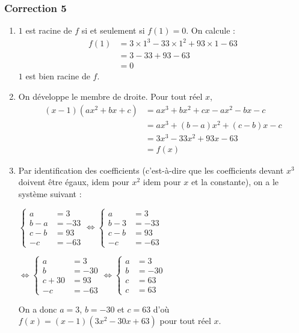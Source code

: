 \documentclass[15pt, mathserif]{beamer}
\begin{document}
\begin{frame}
\vspace{-10mm}
	\frametitle{Correction 5}
\bigskip 
 \begin{enumerate} 
 	 \item $1$ est racine de $f$ si et seulement si $f(1)=0$. On calcule : 
 	 	 \begin{align*}f(1)&= 3 \times 1^3 -33 \times 1^2+93\times 1-63 \\ 
 &= 3-33+93-63 \\ 
 &= 0 
 	  \end{align*} 
  $1$ est bien racine de $f$. 
 	 \item On développe le membre de droite. Pour tout réel $x$, 
 	 \begin{align*} (x-1)(ax^2+bx+c) 
 &= ax^3+bx^2+cx-ax^2-bx-c \\ 
   &= ax^3 +(b-a)x^2+(c-b)x-c \\ 
 &= 3x^3-33x^2+93x-63\\ 
 &= f(x)
 \end{align*} 
 
 \end{enumerate}
 \end{frame} 
 \begin{frame} 
 \begin{enumerate} 
 \setcounter{enumi}{2} 
 	 \item Par identification des coefficients (c'est-à-dire que les coefficients devant $x^3$ doivent être égaux, idem pour $x^2$ idem pour $x$ et la constante), on a le système suivant : 
 
 \hfil $\begin{cases} 
 a &=3 \\ 
  b-a &=-33 \\ 
  c-b &= 93 \\ 
  -c &= -63 
 \end{cases} 
 \Longleftrightarrow 
 \begin{cases} a &=3 \\ 
 b-3&=-33 \\ 
  c-b &= 93 \\ 
  -c &= -63 
 \end{cases} $ 
 
 \hfil $ \Longleftrightarrow 
 \begin{cases} a &=3 \\ 
 b &=-30 \\ 
  c+30 &= 93 \\ 
  -c &= -63 
 \end{cases} 
  \Longleftrightarrow 
 \begin{cases}  a &=3 \\ 
 b &=-30 \\ 
  c &= 63 \\ 
  c &= 63 
 \end{cases}$ 
 
 On a donc $a=3$, $b=-30$ et $c=63$ d'où $f(x)=(x-1)(3x^2-30x+63)$ pour tout réel $x$. 
 \end{enumerate}
 \end{frame} 
\end{document}
